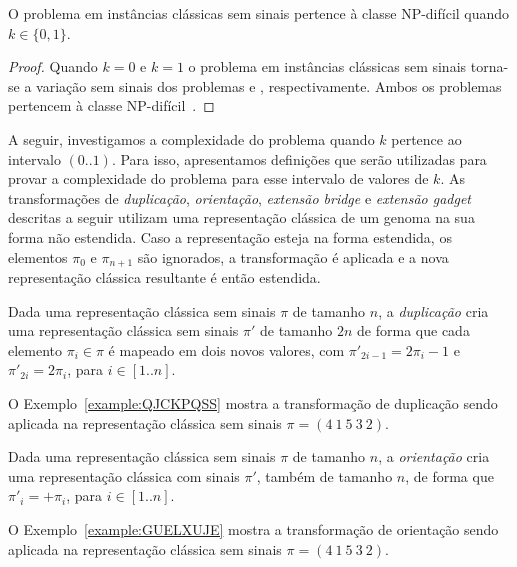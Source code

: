 \begin{lemma}
O problema \SbPRT{} em instâncias clássicas sem sinais pertence à classe NP-difícil quando $k \in \{0,1\}$.
\end{lemma}
\begin{proof}
Quando $k=0$ e $k=1$ o problema \SbPRT{} em instâncias clássicas sem sinais torna-se a variação sem sinais dos problemas \SbRT{} e \SbR{}, respectivamente. Ambos os problemas pertencem à classe NP-difícil~\cite{2019b-oliveira-etal,1999a-caprara}.
\end{proof}

A seguir, investigamos a complexidade do problema \SbPRT{} quando $k$ pertence ao intervalo $(0..1)$. Para isso, apresentamos definições que serão utilizadas para provar a complexidade do problema para esse intervalo de valores de $k$. As transformações de \emph{duplicação}, \emph{orientação}, \emph{extensão bridge} e \emph{extensão gadget} descritas a seguir utilizam uma representação clássica de um genoma na sua forma não estendida. Caso a representação esteja na forma estendida, os elementos $\pi_0$ e $\pi_{n+1}$ são ignorados, a transformação é aplicada e a nova representação clássica resultante é então estendida.

\begin{definition}
Dada uma representação clássica sem sinais $\pi$ de tamanho $n$, a \emph{duplicação} cria uma representação clássica sem sinais $\pi'$ de tamanho $2n$ de forma que cada elemento $\pi_i \in \pi$ é mapeado em dois novos valores, com $\pi'_{2i-1} = 2\pi_i-1$ e $\pi'_{2i} = 2\pi_i$, para $i \in [1..n]$.
\end{definition}

O Exemplo~\ref{example:QJCKPQSS} mostra a transformação de duplicação sendo aplicada na representação clássica sem sinais $\pi=(4~1~5~3~2)$.



\begin{definition}
Dada uma representação clássica sem sinais $\pi$ de tamanho $n$, a \emph{orientação} cria uma representação clássica com sinais $\pi'$, também de tamanho $n$, de forma que $\pi'_{i} = +\pi_i$, para $i \in [1..n]$.
\end{definition}

O Exemplo~\ref{example:GUELXUJE} mostra a transformação de orientação sendo aplicada na representação clássica sem sinais $\pi=(4~1~5~3~2)$.



